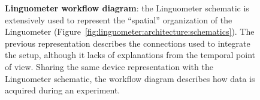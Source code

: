 \begin{figure}%
\centering
{}
	\caption[Linguometer workflow diagram]{\textbf{Linguometer workflow
	diagram}: 
	the Linguometer schematic is extensively used to represent the ``spatial'' 
	organization of the Linguometer 
	(Figure~\ref{fig:linguometer:architecture:schematics}).
	The previous representation describes the
	connections used to integrate the setup, although it lacks of explanations
	from the temporal point of view.
	Sharing the same device representation with the Linguometer schematic,
	the workflow diagram describes how data is acquired during an experiment.}
	\label{fig:linguometer:architecture:workflow}
\end{figure}
